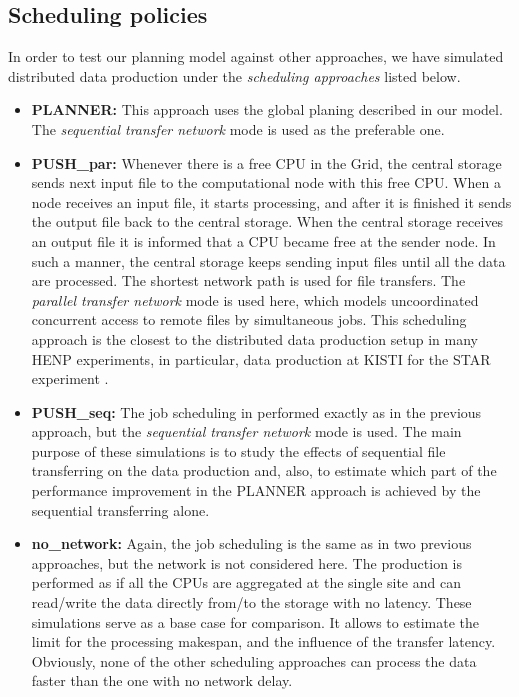\documentclass{svjour3}                     %
\begin{document}
\subsection{Scheduling policies}
In order to test our planning model against other approaches, we have simulated distributed data production under the \textit{scheduling approaches} listed below. 
\begin{itemize}
\label{scenarios}
\item \textbf{PLANNER:}  This approach uses the global planing described in our model. The \textit{sequential transfer network} mode is used as the preferable one. 
\item \textbf{PUSH\_par:} Whenever there is a free CPU in the Grid, the central storage sends next input file to the computational node with this free CPU. When a node receives an input file, it starts processing, and after it is finished it sends the output file back to the central storage. When the central storage receives an output file it is informed that a CPU became free at the sender node. In such a manner, the central storage keeps sending input files until all the data are processed. The shortest network path is used for file transfers. The \textit{parallel transfer network} mode is used here, which models uncoordinated concurrent access to remote files by simultaneous jobs. This scheduling approach is the closest to the distributed data production setup in many HENP experiments, in particular, data production at KISTI for the STAR experiment \cite{KISTI-production}. 
\item \textbf{PUSH\_seq:} The job scheduling in performed exactly as in the previous approach, but the \textit{sequential transfer network} mode is used. The main purpose of these simulations is to study the effects of sequential file transferring on the data production and, also, to estimate which part of the performance improvement in the PLANNER approach is achieved by the sequential transferring alone.
\item \textbf{no\_network:} Again, the job scheduling is the same as in two previous approaches, but the network is not considered here. The production is performed as if all the CPUs are aggregated at the single site and can read/write the data directly from/to the storage with no latency. These simulations serve as a base case for comparison. It allows to estimate the limit for the processing makespan, and the influence of the transfer latency. Obviously, none of the other scheduling approaches can process the data faster than the one with no network delay.
\end{itemize}
\end{document}

